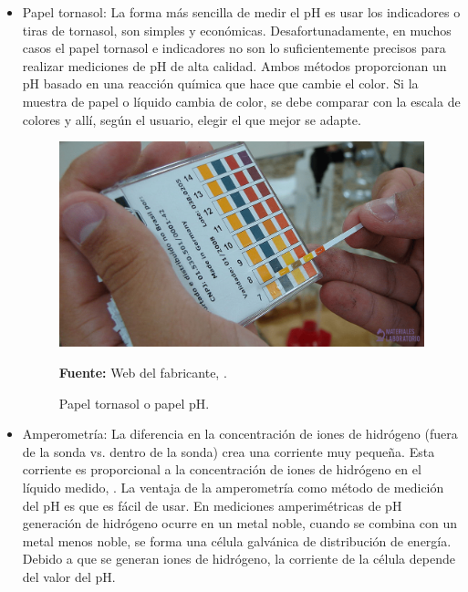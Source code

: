 \begin{itemize}
    \item Papel tornasol: La forma más sencilla de medir el pH es usar los indicadores o tiras de tornasol, son simples y econ\'omicas. Desafortunadamente, en muchos casos el papel tornasol e indicadores no son lo suficientemente precisos para realizar mediciones de pH de alta calidad. 
    Ambos m\'etodos proporcionan un pH basado en una reacci\'on química que hace que cambie el color. 
    Si la muestra de papel o l\'iquido cambia de color, se debe comparar con la escala de colores y all\'i, seg\'un el usuario, elegir el que mejor se adapte.
    \begin{figure}[ht]
        \centering
        \includegraphics[width=0.8\linewidth]{Imagenes/cap2/Papel-tornasol-min.png}\\
        \caption {Papel tornasol o papel pH. }
        \textbf{Fuente:} Web del fabricante, \cite{noauthor_papel-tornasol-min-768x432png_nodate}.
        \label{fig:tornasol}
    \end{figure}
    \item Amperometr\'ia: La diferencia en la concentraci\'on de iones de hidr\'ogeno (fuera de la sonda vs. dentro de la sonda) crea una corriente muy pequeña. 
    Esta corriente es proporcional a la concentraci\'on de iones de hidr\'ogeno en el l\'iquido medido, \cite{Atlas_pH}. 
    La ventaja de la amperometría como m\'etodo de medici\'on del pH es que es f\'acil de usar. 
    En mediciones amperim\'etricas de pH generaci\'on de hidr\'ogeno ocurre en un metal noble, cuando se combina con un metal menos noble, se forma una c\'elula galv\'anica de distribuci\'on de energ\'ia. 
    Debido a que se generan iones de hidr\'ogeno, la corriente de la c\'elula depende del valor del pH. 
    

\end{itemize}
